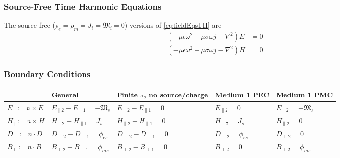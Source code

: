 \documentclass{article}
\numberwithin{equation}{section}
\begin{document}
        \subsubsection{Source-Free Time Harmonic Equations}
            The source-free ($\rho_e = \rho_m = J_i = \mathfrak{M}_i = 0$) versions of
            \eqref{eq:fieldEqsTH} are
            \begin{subequations} \label{eq:fieldEqsSF}
                \begin{align}
                    (- \mu \epsilon \omega^2 + \mu \sigma \omega j - \nabla^2 ) E & = 0
                        \label{eq:electricFieldEqSF} \\
                    ( - \mu \epsilon \omega^2 + \mu \sigma \omega j - \nabla^2 ) H & = 0
                        \label{eq:magneticFieldEqSF}
                \end{align}
            \end{subequations}
        \subsubsection{Boundary Conditions}
            \scriptsize
            \begin{tabular}{ | m{6.5em} || m{7.9em} | m{7.5em} | m{7.7em} | m{7.9em} | }
                \hline
                    & \textbf{General} & \textbf{Finite \( \sigma \), no source/charge} &
                    \textbf{Medium 1 PEC} & \textbf{Medium 1 PMC} \\
                \hline\hline
                    \( E_{\parallel} := n \times E \) & \( E_{\parallel 2} -
                    E_{\parallel 1} = -\mathfrak{M}_s \) & \( E_{\parallel 2} -
                    E_{\parallel 1} = 0 \) & \(E_{\parallel 2} = 0 \) & \( E_{\parallel
                    2} = -\mathfrak{M}_s \) \\
                \( H_{\parallel} := n \times H \) & \( H_{\parallel 2} - H_{\parallel 1} =
                    J_s \) & \( H_{\parallel 2} - H_{\parallel 1} = 0 \) & \( H_{\parallel
                    2} = J_s \) & \( H_{\parallel 2} = 0 \) \\
                \( D_{\perp} := n \cdot D \) & \( D_{\perp 2} - D_{\perp 1} = \phi_{es}
                    \) & \( D_{\perp 2} - D_{\perp 1} = 0 \) & \( D_{\perp 2} =
                    \phi_{es} \) & \( D_{\perp 2} = 0 \) \\
                \( B_{\perp} := n \cdot B \) & \( B_{\perp 2} - B_{\perp 1} = \phi_{ms}
                    \) & \( B_{\perp 2} - B_{\perp 1} = 0 \) & \( B_{\perp 2} = 0 \) & \(
                    B_{\perp 2} = \phi_{ms} \) \\
                \hline
            \end{tabular}
            \normalsize
\end{document}
